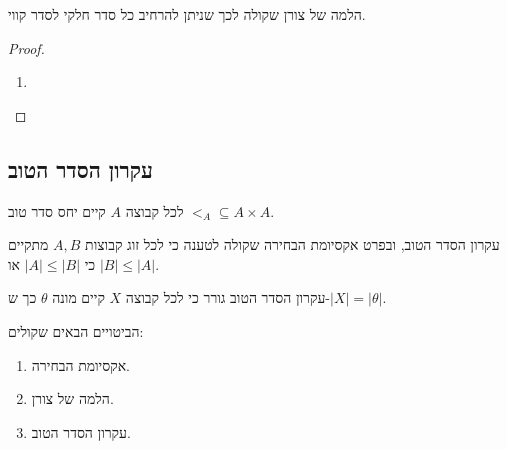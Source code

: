 \documentclass{tstextbook}
\begin{document}
\begin{proposition}
הלמה של צורן שקולה לכך שניתן להרחיב כל סדר חלקי לסדר קווי.

\end{proposition}
\begin{proof}
  \begin{enumerate}
    \item 
  \end{enumerate}
\end{proof}
\subsection{עקרון הסדר הטוב}

\begin{definition}
לכל קבוצה \(A\) קיים יחס סדר טוב \(<_{A}\subseteq A\times A\).

\end{definition}
\begin{proposition}
עקרון הסדר הטוב, ובפרט אקסיומת הבחירה שקולה לטענה כי לכל זוג קבוצות \(A,B\) מתקיים כי \(|A|\leq|B|\) או \(|B|\leq |A|\).

\end{proposition}
\begin{proposition}
עקרון הסדר הטוב גורר כי לכל קבוצה \(X\) קיים מונה \(\theta\) כך ש-\(|X|=|\theta|\).

\end{proposition}
\begin{theorem}[השקילות]
הביטויים הבאים שקולים:

  \begin{enumerate}
    \item אקסיומת הבחירה. 


    \item הלמה של צורן. 


    \item עקרון הסדר הטוב. 


  \end{enumerate}
\end{theorem}
\end{document}
